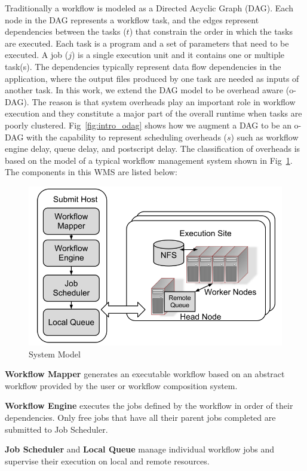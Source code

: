 Traditionally a workflow is modeled as a Directed Acyclic Graph (DAG). Each node in the DAG represents a workflow task, and the edges represent dependencies between the tasks ($t$) that constrain the order in which the tasks are executed. Each task is a program and a set of parameters that need to be executed. A job ($j$) is a single execution unit and it contains one or multiple task(s). The dependencies typically represent data flow dependencies in the application, where the output files produced by one task are needed as inputs of another task. In this work, we extend the DAG model to be overhead aware (o-DAG). The reason is that system overheads play an important role in workflow execution and they constitute a major part of the overall runtime when tasks are poorly clustered. Fig~\ref{fig:intro_odag} shows how we augment a DAG to be an o-DAG with the capability to represent scheduling overheads ($s$) such as workflow engine delay, queue delay, and postscript delay. The classification of overheads is based on the model of a typical workflow management system shown in Fig~\ref{fig:intro_system}. The components in this WMS are listed below: 

\begin{figure}[h!]
\centering
  \includegraphics[width=0.6\linewidth]{figures/introduction/system.png}

  \caption{System Model}
  \label{fig:intro_system}
\end{figure}


\textbf{Workflow Mapper} generates an executable workflow based on an abstract workflow provided by the user or workflow composition system. 

\textbf{Workflow Engine} executes the jobs defined by the workflow in order of their dependencies. Only free jobs that have all their parent jobs completed are submitted to  Job Scheduler. 

\textbf{Job Scheduler} and \textbf{Local Queue} manage individual workflow jobs and supervise their execution on local and remote resources.


